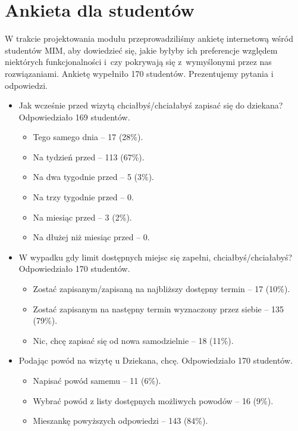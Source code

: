 \documentclass[licencjacka]{pracamgr}
\begin{document}
\section{Ankieta dla studentów} \label{sec:ankieta}
W trakcie projektowania modułu przeprowadziliśmy ankietę internetową wśród studentów MIM, aby dowiedzieć się, jakie byłyby ich preferencje względem niektórych funkcjonalności i~czy pokrywają się z~wymyślonymi przez nas rozwiązaniami. Ankietę wypełniło 170 studentów. Prezentujemy pytania i odpowiedzi.
\begin{itemize}
\setlength\itemsep{0,1em}
\item Jak wcześnie przed wizytą chciałbyś/chciałabyś zapisać się do dziekana?
Odpowiedziało 169 studentów.
\begin{itemize}
\setlength\itemsep{0,1em}
\item Tego samego dnia -- 17 (28\%).
\item Na tydzień przed -- 113 (67\%).
\item Na dwa tygodnie przed -- 5 (3\%).
\item Na trzy tygodnie przed -- 0.
\item Na miesiąc przed -- 3 (2\%).
\item Na dłużej niż miesiąc przed -- 0.
\end{itemize}

\item W wypadku gdy limit dostępnych miejsc się zapełni, chciałbyś/chciałabyś?
Odpowiedziało 170 studentów.
\begin{itemize}
\setlength\itemsep{0,1em}
\item Zostać zapisanym/zapisaną na najbliższy dostępny termin -- 17 (10\%).
\item Zostać zapisanym na następny termin wyznaczony przez siebie -- 135 (79\%).
\item Nic, chcę zapisać się od nowa samodzielnie -- 18 (11\%).
\end{itemize}

\item Podając powód na wizytę u Dziekana, chcę.
Odpowiedziało 170 studentów.
\begin{itemize}
\setlength\itemsep{0,1em}

\item Napisać powód samemu -- 11 (6\%).
\item Wybrać powód z listy dostępnych możliwych powodów -- 16 (9\%).
\item Mieszankę powyższych odpowiedzi -- 143 (84\%).
\end{itemize}


\end{itemize}
\end{document}
